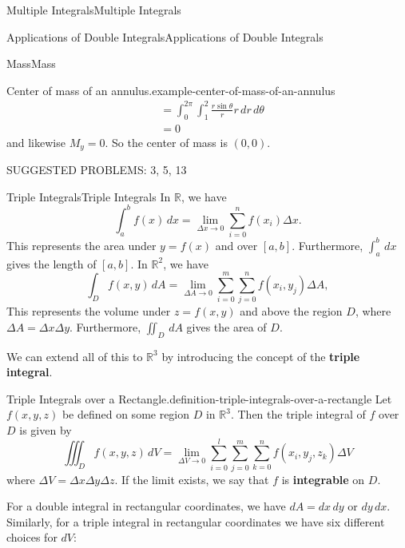\documentclass[10pt,]{book}
\newcommand{\terminology}[1]{\textbf{#1}}
\numberwithin{equation}{section}
\newcommand{\RR}{\mathbb{R}}
\begin{document}
\begin{chapterptx}{Multiple Integrals}{}{Multiple Integrals}{}{}
\begin{sectionptx}{Applications of Double Integrals}{}{Applications of Double Integrals}{}{}
\begin{subsectionptx}{Mass}{}{Mass}{}{}
\begin{example}{Center of mass of an annulus.}{example-center-of-mass-of-an-annulus}
\begin{align*}
& = \int_{0}^{2\pi}\int_{1}^{2} \frac{r\sin\theta}{r}r\,dr\,d\theta \\
& = 0 
\end{align*}
and likewise \(M_{y} = 0\). So the center of mass is \((0,0)\).%
\end{example}
\end{subsectionptx}
\begin{conclusion}{}%
\hypertarget{p-1285}{}%
SUGGESTED PROBLEMS: 3, 5, 13%
\end{conclusion}%
\end{sectionptx}
%
%
\typeout{************************************************}
\typeout{************************************************}
%
\begin{sectionptx}{Triple Integrals}{}{Triple Integrals}{}{}\label{section-triple-integrals}
\hypertarget{p-1286}{}%
In \(\RR\), we have%
\begin{equation*}
\int_{a}^{b}f(x)\,dx = \lim_{\Delta x\to0}\sum_{i=0}^{n}f(x_{i})\Delta x.
\end{equation*}
This represents the area under \(y=f(x)\) and over \([a,b]\). Furthermore, \(\int_{a}^{b}\,dx\) gives the length of \([a,b]\). In \(\mathbb{R}^{2}\), we have%
\begin{equation*}
\int_{D}f(x,y)\,dA = \lim_{\Delta A\to0}\sum_{i=0}^{m}\sum_{j=0}^{n}f(x_{i},y_{j})\Delta A,
\end{equation*}
This represents the volume under \(z = f(x,y)\) and above the region \(D\), where \(\Delta A = \Delta x\Delta y\). Furthermore, \(\iint_{D}\,dA\) gives the area of \(D\).%
\par
\hypertarget{p-1287}{}%
We can extend all of this to \(\RR^{3}\) by introducing the concept of the \terminology{triple integral}.%
\begin{definition}{Triple Integrals over a Rectangle.}{definition-triple-integrals-over-a-rectangle}%
\hypertarget{p-1288}{}%
Let \(f(x,y,z)\) be defined on some region \(D\) in \(\RR^{3}\). Then the triple integral of \(f\) over \(D\) is given by%
\begin{equation*}
\iiint_{D}f(x,y,z)\,dV = \lim_{\Delta V\to0}\sum_{i=0}^{l}\sum_{j=0}^{m}\sum_{k=0}^{n}f(x_{i},y_{j},z_{k})\Delta V
\end{equation*}
where \(\Delta V = \Delta x\Delta y\Delta z\). If the limit exists, we say that \(f\) is \terminology{integrable} on \(D\).%
\end{definition}
\hypertarget{p-1289}{}%
For a double integral in rectangular coordinates, we have \(dA = dx\,dy\) or \(dy\,dx\). Similarly, for a triple integral in rectangular coordinates we have six different choices for \(dV\): \begin{table}

\end{table}
\end{sectionptx}
\end{chapterptx}
\end{document}
